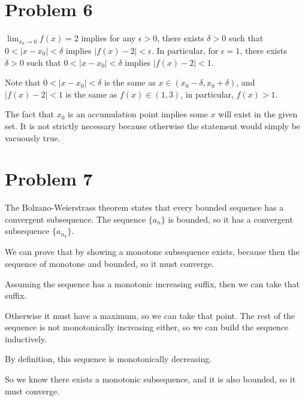 \documentclass{article}
\begin{document}
\section*{Problem 6}
$ \lim_{x_0 \to 0} f(x) = 2 $ implies for any $ \epsilon > 0 $, there exists $ \delta > 0 $ such that $ 0 < |x - x_0| < \delta $ implies $ |f(x) - 2| < \epsilon $. In particular, for $ \epsilon = 1 $, there exists $ \delta > 0 $ such that $ 0 < |x - x_0| < \delta $ implies $ |f(x) - 2| < 1 $.

Note that $ 0 < | x - x_0| < \delta $ is the same as $ x \in (x_0 - \delta, x_0 + \delta) $, and $ |f(x) - 2| < 1 $ is the same as $ f(x) \in (1, 3) $, in particular, $ f(x) > 1 $.

The fact that $ x_0 $ is an accumulation point implies some $ x $ will exist in the given set. It is not strictly necessary because otherwise the statement would simply be vacuously true.

\section*{Problem 7}
The Bolzano-Weierstrass theorem states that every bounded sequence has a convergent subsequence. The sequence $ \{a_n\} $ is bounded, so it has a convergent subsequence $ \{a_{n_k}\} $.

We can prove that by showing a monotone subsequence exists, because then the sequence of monotone and bounded, so it must converge.

Assuming the sequence has a monotonic increasing suffix, then we can take that suffix.

Otherwise it must have a maximum, so we can take that point. The rest of the sequence is not monotonically increasing either, so we can build the sequence inductively.

By definition, this sequence is monotonically decreasing. 

So we know there exists a monotonic subsequence, and it is also bounded, so it must converge.
\end{document}
